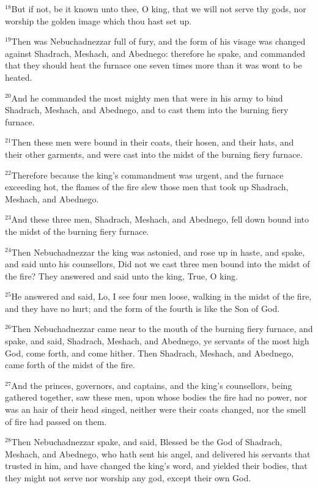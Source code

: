 \documentclass[12pt]{article}
\begin{document}
$^{18}$But if not, be it known unto thee, O king, that we will not serve
thy gods, nor worship the golden image which thou hast set up.


$^{19}$Then was Nebuchadnezzar full of fury, and the form of his visage
was changed against Shadrach, Meshach, and Abednego: therefore he
spake, and commanded that they should heat the furnace one seven times
more than it was wont to be heated.


$^{20}$And he commanded the most mighty men that were in his army to
bind Shadrach, Meshach, and Abednego, and to cast them into the
burning fiery furnace.


$^{21}$Then these men were bound in their coats, their hosen, and their
hats, and their other garments, and were cast into the midst of the
burning fiery furnace.


$^{22}$Therefore because the king's commandment was urgent, and the
furnace exceeding hot, the flames of the fire slew those men that took
up Shadrach, Meshach, and Abednego.


$^{23}$And these three men, Shadrach, Meshach, and Abednego, fell down
bound into the midst of the burning fiery furnace.


$^{24}$Then Nebuchadnezzar the king was astonied, and rose up in haste,
and spake, and said unto his counsellors, Did not we cast three men
bound into the midst of the fire? They answered and said unto the
king, True, O king.


$^{25}$He answered and said, Lo, I see four men loose, walking in the
midst of the fire, and they have no hurt; and the form of the fourth
is like the Son of God.


$^{26}$Then Nebuchadnezzar came near to the mouth of the burning fiery
furnace, and spake, and said, Shadrach, Meshach, and Abednego, ye
servants of the most high God, come forth, and come hither. Then
Shadrach, Meshach, and Abednego, came forth of the midst of the fire.


$^{27}$And the princes, governors, and captains, and the king's
counsellors, being gathered together, saw these men, upon whose bodies
the fire had no power, nor was an hair of their head singed, neither
were their coats changed, nor the smell of fire had passed on them.


$^{28}$Then Nebuchadnezzar spake, and said, Blessed be the God of
Shadrach, Meshach, and Abednego, who hath sent his angel, and
delivered his servants that trusted in him, and have changed the
king's word, and yielded their bodies, that they might not serve nor
worship any god, except their own God.
\end{document}
